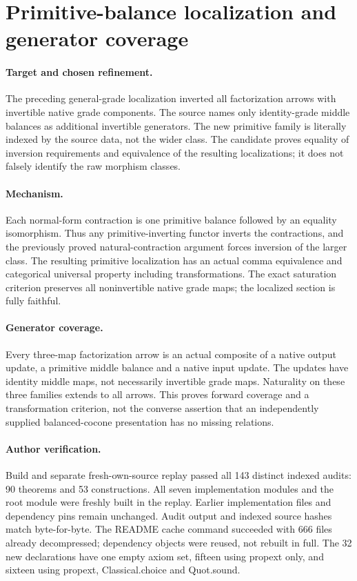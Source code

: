 \documentclass{article}
\begin{document}
\section*{Primitive-balance localization and generator coverage}
\paragraph{Target and chosen refinement.} The preceding general-grade localization inverted all factorization arrows with invertible native grade components. The source names only identity-grade middle balances as additional invertible generators. The new primitive family is literally indexed by the source data, not the wider class. The candidate proves equality of inversion requirements and equivalence of the resulting localizations; it does not falsely identify the raw morphism classes.
\paragraph{Mechanism.} Each normal-form contraction is one primitive balance followed by an equality isomorphism. Thus any primitive-inverting functor inverts the contractions, and the previously proved natural-contraction argument forces inversion of the larger class. The resulting primitive localization has an actual comma equivalence and categorical universal property including transformations. The exact saturation criterion preserves all noninvertible native grade maps; the localized section is fully faithful.
\paragraph{Generator coverage.} Every three-map factorization arrow is an actual composite of a native output update, a primitive middle balance and a native input update. The updates have identity middle maps, not necessarily invertible grade maps. Naturality on these three families extends to all arrows. This proves forward coverage and a transformation criterion, not the converse assertion that an independently supplied balanced-cocone presentation has no missing relations.
\paragraph{Author verification.} Build and separate fresh-own-source replay passed all 143 distinct indexed audits: 90 theorems and 53 constructions. All seven implementation modules and the root module were freshly built in the replay. Earlier implementation files and dependency pins remain unchanged. Audit output and indexed source hashes match byte-for-byte. The README cache command succeeded with 666 files already decompressed; dependency objects were reused, not rebuilt in full. The 32 new declarations have one empty axiom set, fifteen using propext only, and sixteen using propext, Classical.choice and Quot.sound.
\end{document}
